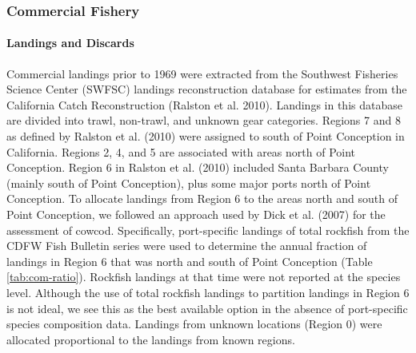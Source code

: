\documentclass[11pt,
  english,
  letterpaper,
]{article}
\begin{document}
\hypertarget{commercial-fishery}{%
\subsubsection{Commercial Fishery}\label{commercial-fishery}}

\hypertarget{landings-and-discards}{%
\paragraph{Landings and Discards}\label{landings-and-discards}}

\hfill\break

Commercial landings prior to 1969 were extracted from the Southwest Fisheries Science Center (SWFSC) landings reconstruction database for estimates from the California Catch Reconstruction (Ralston et al. 2010). Landings in this database are divided into trawl, non-trawl, and unknown gear categories. Regions 7 and 8 as defined by Ralston et al. (2010) were assigned to south of Point Conception in California. Regions 2, 4, and 5 are associated with areas north of Point Conception. Region 6 in Ralston et al. (2010) included Santa Barbara County (mainly south of Point Conception), plus some major ports north of Point Conception. To allocate landings from Region 6 to the areas north and south of Point Conception, we followed an approach used by Dick et al. (2007) for the assessment of cowcod. Specifically, port-specific landings of total rockfish from the CDFW Fish Bulletin series were used to determine the annual fraction of landings in Region 6 that was north and south of Point Conception (Table \ref{tab:com-ratio}). Rockfish landings at that time were not reported at the species level. Although the use of total rockfish landings to partition landings in Region 6 is not ideal, we see this as the best available option in the absence of port-specific species composition data. Landings from unknown locations (Region 0) were allocated proportional to the landings from known regions.
\end{document}
